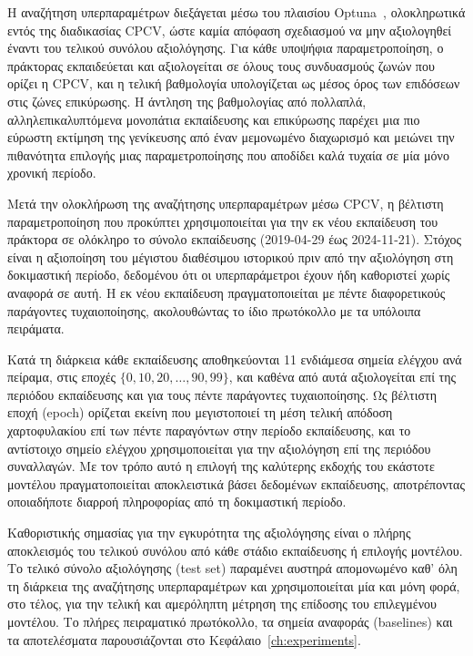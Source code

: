 Η αναζήτηση υπερπαραμέτρων διεξάγεται μέσω του πλαισίου Optuna~\cite{akiba2019optuna},
ολοκληρωτικά εντός της διαδικασίας CPCV, ώστε καμία απόφαση σχεδιασμού να μην
αξιολογηθεί έναντι του τελικού συνόλου αξιολόγησης. Για κάθε υποψήφια
παραμετροποίηση, ο πράκτορας εκπαιδεύεται και αξιολογείται σε όλους τους
συνδυασμούς ζωνών που ορίζει η CPCV, και η τελική βαθμολογία υπολογίζεται ως
μέσος όρος των επιδόσεων στις ζώνες επικύρωσης. Η άντληση της βαθμολογίας από
πολλαπλά, αλληλεπικαλυπτόμενα μονοπάτια εκπαίδευσης και επικύρωσης παρέχει μια
πιο εύρωστη εκτίμηση της γενίκευσης από έναν μεμονωμένο διαχωρισμό και μειώνει
την πιθανότητα επιλογής μιας παραμετροποίησης που αποδίδει καλά τυχαία σε μία
μόνο χρονική περίοδο.

Μετά την ολοκλήρωση της αναζήτησης υπερπαραμέτρων μέσω CPCV, η βέλτιστη
παραμετροποίηση που προκύπτει χρησιμοποιείται για την εκ νέου εκπαίδευση του
πράκτορα σε ολόκληρο το σύνολο εκπαίδευσης (2019-04-29 έως 2024-11-21). 
Στόχος είναι η αξιοποίηση του μέγιστου διαθέσιμου
ιστορικού πριν από την αξιολόγηση στη δοκιμαστική περίοδο, δεδομένου ότι οι
υπερπαράμετροι έχουν ήδη καθοριστεί χωρίς αναφορά σε αυτή. Η εκ νέου
εκπαίδευση πραγματοποιείται με πέντε διαφορετικούς παράγοντες τυχαιοποίησης,
ακολουθώντας το ίδιο πρωτόκολλο με τα υπόλοιπα πειράματα.

Κατά τη διάρκεια κάθε εκπαίδευσης αποθηκεύονται 11 ενδιάμεσα σημεία ελέγχου
ανά πείραμα, στις εποχές $\{0, 10, 20, \ldots, 90, 99\}$, και καθένα από αυτά
αξιολογείται επί της περιόδου εκπαίδευσης και για τους πέντε παράγοντες τυχαιοποίησης. 
Ως βέλτιστη εποχή (epoch) ορίζεται εκείνη που μεγιστοποιεί
τη μέση τελική απόδοση χαρτοφυλακίου επί των πέντε παραγόντων στην περίοδο
εκπαίδευσης, και το αντίστοιχο σημείο ελέγχου χρησιμοποιείται για την
αξιολόγηση επί της περιόδου συναλλαγών. Με τον τρόπο αυτό η επιλογή
της καλύτερης εκδοχής του εκάστοτε μοντέλου πραγματοποιείται αποκλειστικά βάσει δεδομένων εκπαίδευσης,
αποτρέποντας οποιαδήποτε διαρροή πληροφορίας από τη δοκιμαστική περίοδο.

Καθοριστικής σημασίας για την εγκυρότητα της αξιολόγησης είναι ο πλήρης
αποκλεισμός του τελικού συνόλου από κάθε στάδιο εκπαίδευσης ή επιλογής
μοντέλου. Το τελικό σύνολο αξιολόγησης (test set) παραμένει αυστηρά απομονωμένο
καθ' όλη τη διάρκεια της αναζήτησης υπερπαραμέτρων και χρησιμοποιείται μία και
μόνη φορά, στο τέλος, για την τελική και αμερόληπτη μέτρηση της επίδοσης του
επιλεγμένου μοντέλου. Το πλήρες πειραματικό πρωτόκολλο, τα σημεία αναφοράς
(baselines) και τα αποτελέσματα παρουσιάζονται στο
Κεφάλαιο~\ref{ch:experiments}.